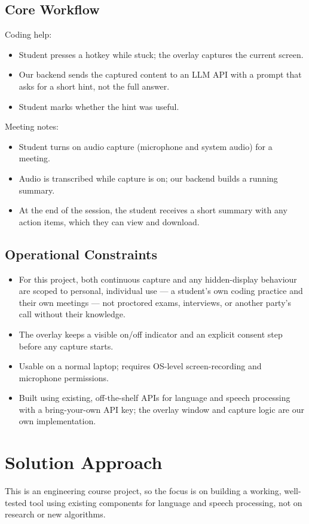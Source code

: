 \documentclass[11pt]{article}
\begin{document}
\subsection{Core Workflow}
Coding help:
\begin{itemize}
  \item Student presses a hotkey while stuck; the overlay captures the current screen.
  \item Our backend sends the captured content to an LLM API with a prompt that asks for a
    short hint, not the full answer.
  \item Student marks whether the hint was useful.
\end{itemize}
Meeting notes:
\begin{itemize}
  \item Student turns on audio capture (microphone and system audio) for a meeting.
  \item Audio is transcribed while capture is on; our backend builds a running summary.
  \item At the end of the session, the student receives a short summary with any action
    items, which they can view and download.
\end{itemize}

\subsection{Operational Constraints}
\begin{itemize}
  \item For this project, both continuous capture and any hidden-display behaviour are
    scoped to personal, individual use --- a student's own coding practice and their own
    meetings --- not proctored exams, interviews, or another party's call without their
    knowledge.
  \item The overlay keeps a visible on/off indicator and an explicit consent step before any
    capture starts.
  \item Usable on a normal laptop; requires OS-level screen-recording and microphone
    permissions.
  \item Built using existing, off-the-shelf APIs for language and speech processing with a
    bring-your-own API key; the overlay window and capture logic are our own implementation.
\end{itemize}

\section{Solution Approach}
This is an engineering course project, so the focus is on building a working, well-tested
tool using existing components for language and speech processing, not on research or new
algorithms.
\end{document}
